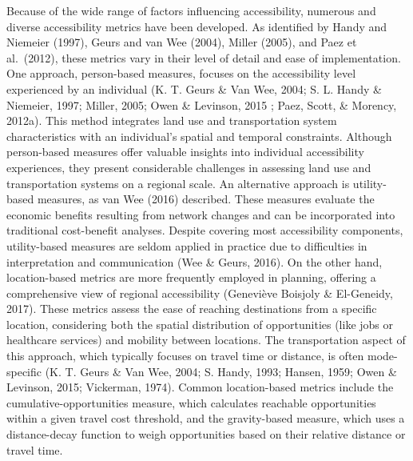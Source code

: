 \documentclass[
11pt, %
oneside, %
english, %
singlespacing, %
]{macthesis} %
\begin{document}
Because of the wide range of factors influencing accessibility, numerous and diverse accessibility metrics have been developed. As identified by Handy and Niemeier (1997), Geurs and van Wee (2004), Miller (2005), and Paez et al.~(2012), these metrics vary in their level of detail and ease of implementation. One approach, person-based measures, focuses on the accessibility level experienced by an individual (K. T. Geurs \& Van Wee, 2004; S. L. Handy \& Niemeier, 1997; Miller, 2005; Owen \& Levinson, 2015 ; Paez, Scott, \& Morency, 2012a). This method integrates land use and transportation system characteristics with an individual's spatial and temporal constraints. Although person-based measures offer valuable insights into individual accessibility experiences, they present considerable challenges in assessing land use and transportation systems on a regional scale. An alternative approach is utility-based measures, as van Wee (2016) described. These measures evaluate the economic benefits resulting from network changes and can be incorporated into traditional cost-benefit analyses. Despite covering most accessibility components, utility-based measures are seldom applied in practice due to difficulties in interpretation and communication (Wee \& Geurs, 2016).
On the other hand, location-based metrics are more frequently employed in planning, offering a comprehensive view of regional accessibility (Geneviève Boisjoly \& El-Geneidy, 2017). These metrics assess the ease of reaching destinations from a specific location, considering both the spatial distribution of opportunities (like jobs or healthcare services) and mobility between locations. The transportation aspect of this approach, which typically focuses on travel time or distance, is often mode-specific (K. T. Geurs \& Van Wee, 2004; S. Handy, 1993; Hansen, 1959; Owen \& Levinson, 2015; Vickerman, 1974). Common location-based metrics include the cumulative-opportunities measure, which calculates reachable opportunities within a given travel cost threshold, and the gravity-based measure, which uses a distance-decay function to weigh opportunities based on their relative distance or travel time.
\end{document}
